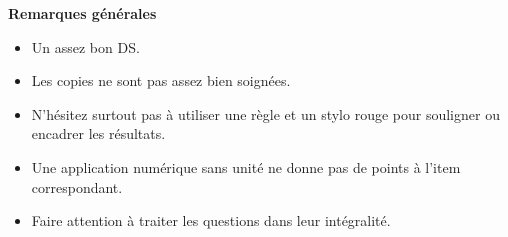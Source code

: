 \documentclass[10pt,fleqn]{article} %
\begin{document}

\pagestyle{fancy}
\thispagestyle{plain}


\def\columnseprulecolor{\color{ocre}}
\setlength{\columnseprule}{0.4pt} 



\vspace{6cm}
%
%
\textbf{Remarques générales}
\begin{itemize}
\item Un assez bon DS. 
\item Les copies ne sont pas assez bien soignées. 
\item N'hésitez surtout pas à utiliser une règle et un stylo rouge pour souligner ou encadrer les résultats. 
\item Une application numérique sans unité ne donne pas de points à l'item correspondant. 
\item Faire attention à traiter les questions dans leur intégralité. 
\end{itemize}
\end{document}
